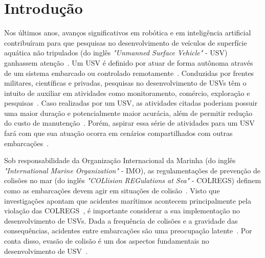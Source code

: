 


\chapter{Introdução}\label{chap1:intro}
	Nos últimos anos, avanços significativos em robótica e em inteligência artificial contribuíram para que pesquisas no desenvolvimento de veículos de superfície aquática não tripulados (do inglês \textit{"Unmanned Surface Vehicle"} - USV) ganhassem atenção~\cite{HUANG2020451}. Um USV é definido por atuar de forma autônoma através de um sistema embarcado ou controlado remotamente~\cite{SONG2018351}. Conduzidas por frentes militares, científicas e privadas, pesquisas no desenvolvimento de USVs têm o intuito de auxiliar em atividades como monitoramento, comércio, exploração e pesquisas~\cite{JURAK2020}. Caso realizadas por um USV, as atividades citadas poderiam possuir uma maior duração e potencialmente maior acurácia, além de permitir redução do custo de manutenção~\cite{LIU201671}. Porém, aspirar essa série de atividades para um USV fará com que sua atuação ocorra em cenários compartilhados com outras embarcações~\cite{KUWATA2014110}.

    Sob responsabilidade da Organização Internacional da Marinha (do inglês \textit{"International Marine Organization"} - IMO), as regulamentações de prevenção de colisões no mar (do inglês \textit{"COLlision REGulations at Sea"} - COLREGS) definem como as embarcações devem agir em situações de colisão~\cite{JURAK2020}. Visto que investigações apontam que acidentes marítimos acontecem principalmente pela violação das COLREGS~\cite{SONG2018351}, é importante considerar a sua implementação no desenvolvimento de USVs. Dada a frequência de colisões e a gravidade das consequências, acidentes entre embarcações são uma preocupação latente~\cite{HUANG2019142}. Por conta disso, evasão de colisão é um dos aspectos fundamentais no desenvolvimento de USV~\cite{JURAK2020}. 


